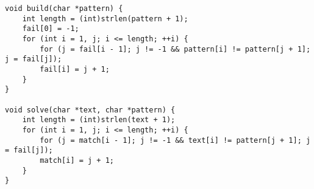 \begin{lstlisting}
void build(char *pattern) {
    int length = (int)strlen(pattern + 1);
    fail[0] = -1;
    for (int i = 1, j; i <= length; ++i) {
        for (j = fail[i - 1]; j != -1 && pattern[i] != pattern[j + 1]; j = fail[j]);
        fail[i] = j + 1;
    }
}

void solve(char *text, char *pattern) {
    int length = (int)strlen(text + 1);
    for (int i = 1, j; i <= length; ++i) {
        for (j = match[i - 1]; j != -1 && text[i] != pattern[j + 1]; j = fail[j]);
        match[i] = j + 1;
    }
}
\end{lstlisting}
